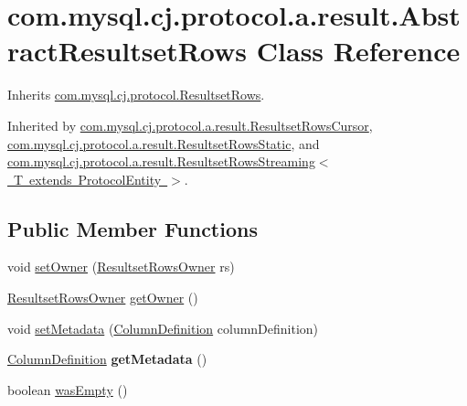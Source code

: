 \hypertarget{classcom_1_1mysql_1_1cj_1_1protocol_1_1a_1_1result_1_1_abstract_resultset_rows}{}\section{com.\+mysql.\+cj.\+protocol.\+a.\+result.\+Abstract\+Resultset\+Rows Class Reference}
\label{classcom_1_1mysql_1_1cj_1_1protocol_1_1a_1_1result_1_1_abstract_resultset_rows}


Inherits \mbox{\hyperlink{interfacecom_1_1mysql_1_1cj_1_1protocol_1_1_resultset_rows}{com.\+mysql.\+cj.\+protocol.\+Resultset\+Rows}}.



Inherited by \mbox{\hyperlink{classcom_1_1mysql_1_1cj_1_1protocol_1_1a_1_1result_1_1_resultset_rows_cursor}{com.\+mysql.\+cj.\+protocol.\+a.\+result.\+Resultset\+Rows\+Cursor}}, \mbox{\hyperlink{classcom_1_1mysql_1_1cj_1_1protocol_1_1a_1_1result_1_1_resultset_rows_static}{com.\+mysql.\+cj.\+protocol.\+a.\+result.\+Resultset\+Rows\+Static}}, and \mbox{\hyperlink{classcom_1_1mysql_1_1cj_1_1protocol_1_1a_1_1result_1_1_resultset_rows_streaming}{com.\+mysql.\+cj.\+protocol.\+a.\+result.\+Resultset\+Rows\+Streaming$<$ T extends Protocol\+Entity $>$}}.

\subsection*{Public Member Functions}
\begin{DoxyCompactItemize}
\item 
void \mbox{\hyperlink{classcom_1_1mysql_1_1cj_1_1protocol_1_1a_1_1result_1_1_abstract_resultset_rows_aa020316d48045e8ade0aaeddf40d1de6}{set\+Owner}} (\mbox{\hyperlink{interfacecom_1_1mysql_1_1cj_1_1protocol_1_1_resultset_rows_owner}{Resultset\+Rows\+Owner}} rs)
\item 
\mbox{\hyperlink{interfacecom_1_1mysql_1_1cj_1_1protocol_1_1_resultset_rows_owner}{Resultset\+Rows\+Owner}} \mbox{\hyperlink{classcom_1_1mysql_1_1cj_1_1protocol_1_1a_1_1result_1_1_abstract_resultset_rows_ae7b769392c5668dabf45c80e36ec216e}{get\+Owner}} ()
\item 
void \mbox{\hyperlink{classcom_1_1mysql_1_1cj_1_1protocol_1_1a_1_1result_1_1_abstract_resultset_rows_a13f4342893e5c2c6ca06237af1e585a7}{set\+Metadata}} (\mbox{\hyperlink{interfacecom_1_1mysql_1_1cj_1_1protocol_1_1_column_definition}{Column\+Definition}} column\+Definition)
\item 
\mbox{\label{classcom_1_1mysql_1_1cj_1_1protocol_1_1a_1_1result_1_1_abstract_resultset_rows_af9d20b6a50813a1c1bf8695e68f46467}} 
\mbox{\hyperlink{interfacecom_1_1mysql_1_1cj_1_1protocol_1_1_column_definition}{Column\+Definition}} {\bfseries get\+Metadata} ()
\item 
boolean \mbox{\hyperlink{classcom_1_1mysql_1_1cj_1_1protocol_1_1a_1_1result_1_1_abstract_resultset_rows_ae97f8b33948868aab21df7320f9f91f4}{was\+Empty}} ()
\end{DoxyCompactItemize}
